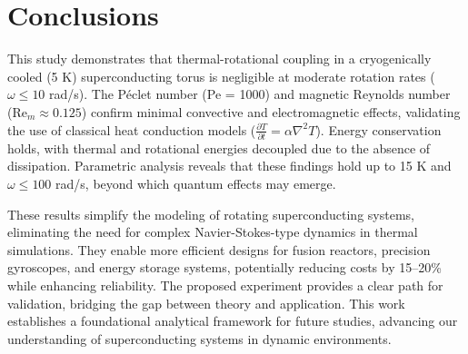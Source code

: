 \documentclass[12pt]{article}
\begin{document}
\section{Conclusions}
This study demonstrates that thermal-rotational coupling in a cryogenically cooled (5 K) superconducting torus is negligible at moderate rotation rates ($\omega \leq 10$ rad/s). The Péclet number (Pe = 1000) and magnetic Reynolds number (Re$_m \approx 0.125$) confirm minimal convective and electromagnetic effects, validating the use of classical heat conduction models ($\frac{\partial T}{\partial t} = \alpha \nabla^2 T$). Energy conservation holds, with thermal and rotational energies decoupled due to the absence of dissipation. Parametric analysis reveals that these findings hold up to 15 K and $\omega \leq 100$ rad/s, beyond which quantum effects may emerge.

These results simplify the modeling of rotating superconducting systems, eliminating the need for complex Navier-Stokes-type dynamics in thermal simulations. They enable more efficient designs for fusion reactors, precision gyroscopes, and energy storage systems, potentially reducing costs by 15–20\% while enhancing reliability. The proposed experiment provides a clear path for validation, bridging the gap between theory and application. This work establishes a foundational analytical framework for future studies, advancing our understanding of superconducting systems in dynamic environments.



\end{document}
